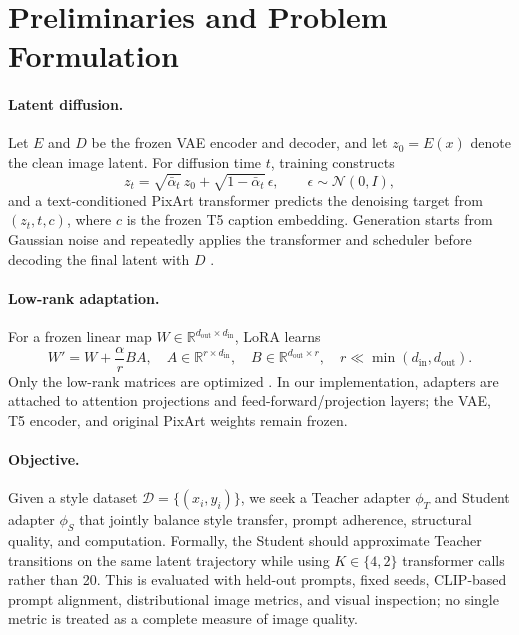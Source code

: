 \documentclass{article}
\begin{document}
\section{Preliminaries and Problem Formulation}

\paragraph{Latent diffusion.}
Let $E$ and $D$ be the frozen VAE encoder and decoder, and let $z_0=E(x)$ denote the clean image latent. For diffusion time $t$, training constructs
\begin{equation}
z_t=\sqrt{\bar{\alpha}_t}\,z_0+\sqrt{1-\bar{\alpha}_t}\,\epsilon,
\qquad \epsilon\sim\mathcal{N}(0,I),
\end{equation}
and a text-conditioned PixArt transformer predicts the denoising target from $(z_t,t,c)$, where $c$ is the frozen T5 caption embedding. Generation starts from Gaussian noise and repeatedly applies the transformer and scheduler before decoding the final latent with $D$ \cite{chen2024pixartsigma,song2021ddim}.

\paragraph{Low-rank adaptation.}
For a frozen linear map $W\in\mathbb{R}^{d_{\mathrm{out}}\times d_{\mathrm{in}}}$, LoRA learns
\begin{equation}
W'=W+\frac{\alpha}{r}BA,
\quad A\in\mathbb{R}^{r\times d_{\mathrm{in}}},\quad
B\in\mathbb{R}^{d_{\mathrm{out}}\times r},\quad r\ll \min(d_{\mathrm{in}},d_{\mathrm{out}}).
\end{equation}
Only the low-rank matrices are optimized \cite{hu2022lora}. In our implementation, adapters are attached to attention projections and feed-forward/projection layers; the VAE, T5 encoder, and original PixArt weights remain frozen.

\paragraph{Objective.}
Given a style dataset $\mathcal{D}=\{(x_i,y_i)\}$, we seek a Teacher adapter $\phi_T$ and Student adapter $\phi_S$ that jointly balance style transfer, prompt adherence, structural quality, and computation. Formally, the Student should approximate Teacher transitions on the same latent trajectory while using $K\in\{4,2\}$ transformer calls rather than 20. This is evaluated with held-out prompts, fixed seeds, CLIP-based prompt alignment, distributional image metrics, and visual inspection; no single metric is treated as a complete measure of image quality.
\end{document}
